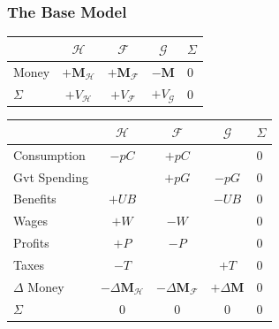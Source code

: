 \documentclass[]{beamer}
\begin{document}
\begin{frame}
	\frametitle{The Base Model}
	\begin{table}
		\centering
		\begin{tabular}{l|ccc|l}
			& $\mathcal{H}$             & $\mathcal{F}$               & $\mathcal{G}$    & $\Sigma$ \\
			\midrule
			Money    & $+\mathbf{M}_\mathcal{H}$ & $+\mathbf{M}_{\mathcal{F}}$ & $-\mathbf{M}$    & 0        \\
			\midrule
			$\Sigma$ & $+V_\mathcal{H}$          & $+V_{\mathcal{F}}$          & $+V_\mathcal{G}$ & 0        \\
		\end{tabular}
	\end{table}
	
	\begin{table}
		\centering
		\begin{tabular}{l|ccc|l}
			
			& $\mathcal{H}$                   & $\mathcal{F} $                  & $\mathcal{G}$       & $\Sigma$ \\
			\midrule
			Consumption    & $-p C$                          & $+p C$                          &                     & 0        \\
			Gvt Spending   &                                 & $+p G$                          & $-p G$              & 0        \\
			Benefits       & $+UB$                           &                                 & $-UB$               & 0        \\
			Wages          & $+W$                            & $-W$                            &                     & 0        \\
			Profits        & $+P$                            & $-P$                            &                     & 0        \\
			Taxes          &
			$-T$           &                                 & $+T$                            & 0                              \\
			\midrule
			$\Delta$ Money & $-\Delta\mathbf{M}_\mathcal{H}$ & $-\Delta\mathbf{M}_\mathcal{F}$ & $+\Delta\mathbf{M}$ & 0        \\
			\midrule
			$\Sigma$       & 0                               & 0                               & 0                   & 0        \\
		\end{tabular}
	\end{table}
\end{frame}
\end{document}
